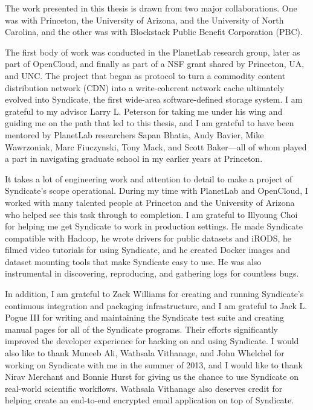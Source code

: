 The work presented in this thesis is drawn from two major collaborations.
One was with Princeton, the University of Arizona, and the University of North Carolina, 
and the other was with Blockstack Public Benefit Corporation (PBC).

The first body of work was conducted in the PlanetLab research
group, later as part of OpenCloud, and finally as part of a NSF grant shared by
Princeton, UA, and UNC.  The project that began as
protocol to turn a commodity content distribution network (CDN) into a write-coherent 
network cache ultimately evolved into Syndicate, the first wide-area
software-defined storage system.  I am grateful to my advisor Larry L. Peterson
for taking me under his wing and guiding me on the path that led to this
thesis, and I am grateful to have been mentored by 
PlanetLab researchers Sapan Bhatia, Andy Bavier, Mike Wawrzoniak, Marc
Fiuczynski, Tony Mack, and Scott Baker---all of whom played a part in navigating
graduate school in my earlier years at Princeton.

It takes a lot of engineering work and attention to
detail to make a project of Syndicate's scope operational.
During my time with PlanetLab and OpenCloud, I worked with many talented people
at Princeton and the University of Arizona who helped 
see this task through to completion.  I am grateful to Illyoung Choi for helping me get
Syndicate to work in production settings.  He made Syndicate compatible with Hadoop,
he wrote drivers for public datasets and iRODS, he filmed video tutorials 
for using Syndicate, and he created Docker images and dataset mounting tools
that make Syndicate easy to use.  He was also instrumental in discovering,
reproducing, and gathering logs for countless bugs.

In addition, I am grateful to Zack Williams
for creating and running Syndicate's continuous integration and packaging
infrastructure, and I am grateful to Jack L. Pogue III for writing
and maintaining the Syndicate test suite and creating manual pages for all of
the Syndicate programs.  Their efforts significantly improved the developer
experience for hacking on and using Syndicate.
I would also like to thank Muneeb Ali, Wathsala Vithanage,
and John Whelchel for working on Syndicate with me in the summer of 2013,
and I would like to thank Nirav Merchant and Bonnie Hurst
for giving us the chance to use Syndicate on real-world scientific workflows.
Wathsala Vithanage also deserves credit for helping create an end-to-end
encrypted email application on top of Syndicate.

